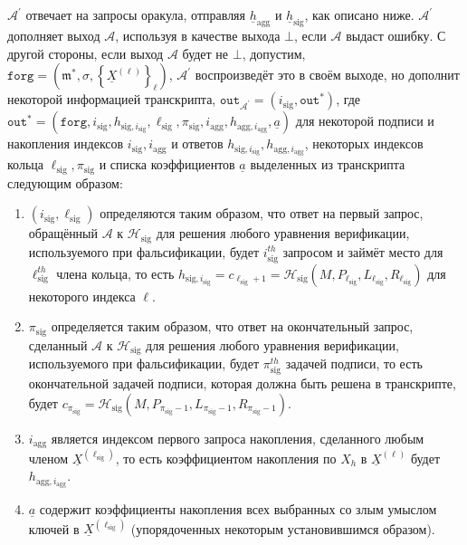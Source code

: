 \documentclass{mrl}
\theoremstyle{definition}
\numberwithin{theorem}{subsection}
\newcommand{\adversary}{\mathcal{A}}
\newcommand{\m}{\mathfrak{m}}
\begin{document}
$\adversary^\prime$ отвечает на запросы оракула, отправляя $\underline{h}_{\text{agg}}$ и $\underline{h}_{\text{sig}}$, как описано ниже. $\adversary^\prime$ дополняет выход $\adversary$, используя в качестве выхода $\bot$, если $\adversary$ выдаст ошибку. С другой стороны, если выход $\adversary$ будет не $\bot$, допустим, $\texttt{forg} = \left(\m^*, \sigma, \left\{\underline{X}^{(\ell)}\right\}_\ell\right)$, $\adversary^\prime$ воспроизведёт это в своём выходе, но дополнит некоторой информацией транскрипта, $\texttt{out}_{\adversary^\prime} = (i_{\text{sig}}, \texttt{out}^*)$, где $\texttt{out}^* = (\texttt{forg}, i_{\text{sig}}, h_{\text{sig}, i_{\text{sig}}}, \ell_{\text{sig}}, \pi_{\text{sig}}, i_{\text{agg}}, h_{\text{agg}, i_{\text{agg}}}, \underline{a})$ для некоторой подписи и накопления индексов $i_{\text{sig}}, i_{\text{agg}}$ и ответов $h_{\text{sig}, i_{\text{sig}}}, h_{\text{agg}, i_{\text{agg}}}$, некоторых индексов кольца $\ell_{\text{sig}}, \pi_{\text{sig}}$ и списка коэффициентов $\underline{a}$ выделенных из транскрипта следующим образом:
\begin{enumerate}
\item $(i_{\text{sig}}, \ell_{\text{sig}})$ определяются таким образом, что ответ на первый запрос, обращённый $\adversary$ к $\mathcal{H}_{\text{sig}}$ для решения любого уравнения верификации, используемого при фальсификации, будет $i_{\text{sig}}^{th}$ запросом и займёт место для $\ell_{\text{sig}}^{th}$ члена кольца, то есть $h_{\text{sig}, i_{\text{sig}}} = c_{\ell_{\text{sig}}+1} = \mathcal{H}_{\text{sig}}(M, P_{\ell_{\text{sig}}}, L_{\ell_{\text{sig}}}, R_{\ell_{\text{sig}}})$ для некоторого индекса $\ell$.

\item $\pi_{\text{sig}}$ определяется таким образом, что ответ на окончательный запрос, сделанный $\adversary$ к $\mathcal{H}_{\text{sig}}$ для решения любого уравнения верификации, используемого при фальсификации, будет $\pi_{\text{sig}}^{th}$ задачей подписи, то есть окончательной задачей подписи, которая должна быть решена в транскрипте, будет $c_{\pi_{\text{sig}}} = \mathcal{H}_{\text{sig}}(M, P_{\pi_{\text{sig}}-1}, L_{\pi_{\text{sig}}-1}, R_{\pi_{\text{sig}}-1})$.

\item $i_{\text{agg}}$ является индексом первого запроса накопления, сделанного любым членом $\underline{X}^{(\ell_{\text{sig}})}$, то есть коэффициентом накопления по $X_h$ в $\underline{X}^{(\ell)}$ будет $h_{\text{agg},i_{\text{agg}}}$.

\item $\underline{a}$ содержит коэффициенты накопления всех выбранных со злым умыслом ключей в $\underline{X}^{(\ell_{\text{sig}})}$ (упорядоченных некоторым установившимся образом).


\end{enumerate}
\end{document}
